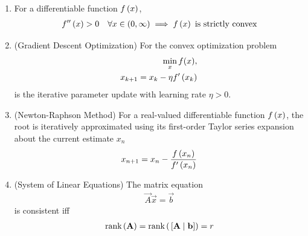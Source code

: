 \begin{enumerate}[label=\thesubsection.\arabic*, ref=\thesubsection.\theenumi,itemsep=0pt]
\item 
For a differentiable function $f\left(x\right)$,
\begin{align}
f''\left(x\right) > 0 \quad \forall x \in \left(0, \infty\right) \implies f\left(x\right) \text{ is strictly convex} \label{eq:EE26BTECH11213-convexity_check}
\end{align}
\item (Gradient Descent Optimization) For the convex optimization problem
\begin{align}
	\min_x f(x),
	\\
x_{k+1} = x_k - \eta f'\left(x_k\right) \label{eq:EE26BTECH11213-grad_descent_update}
\end{align}
is the iterative parameter update with learning rate $\eta > 0$. 
\item (Newton-Raphson Method)
For a real-valued differentiable function $f\left(x\right)$, the root is iteratively approximated using its first-order Taylor series expansion about the current estimate $x_n$
\begin{align}
x_{n+1} = x_n - \frac{f\left(x_n\right)}{f'\left(x_n\right)} 
\label{eq:EE26BTECH11213-newton_raphson}
\end{align}
\item (System of Linear Equations) 
The matrix equation
\begin{align}
\vec{A}\vec{x} = \vec{b} \label{eq:EE26BTECH11213-linear_sys}
\end{align}
    is consistent iff
    \begin{align}
    \text{rank}\left(\mathbf{A}\right) = \text{rank}\left({}\left[\mathbf{A} \mid \mathbf{b}\right]\right) = r \label{eq:EE26BTECH11213-consistent_rank}
    \end{align}

\end{enumerate}
